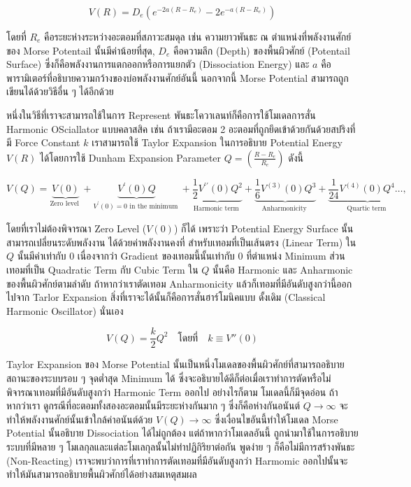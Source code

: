 \begin{equation}
  \label{eq:potential_bond_stretch}
  V(R) = D_{e} \left( e^{-2a(R-R_{e})} -2e^{-a(R-R_{e})} \right)
\end{equation}

\noindent โดยที่ $R_{e}$ คือระยะห่างระหว่างอะตอมที่สภาวะสมดุล เช่น ความยาวพันธะ ณ ตำแหน่งที่พลังงานศักย์ของ Morse Potentail
นั้นมีค่าน้อยที่สุด, $D_{e}$ คือความลึก (Depth) ของพื้นผิวศักย์ (Potentail Surface) ซึ่งก็คือพลังงานการแตกออกหรือการแยกตัว (Dissociation
Energy) และ $a$ คือพารามิเตอร์ที่อธิบายความกว้างของบ่อพลังงานศักย์อันนี้ นอกจากนี้ Morse Potential สามารถถูกเขียนได้ด้วยวิธีอื่น ๆ ได้อีกด้วย

หนึ่งในวิธีที่เราจะสามารถใช้ในการ Represent พันธะโควาเลนท์ก็คือการใช้โมเดลการสั่น Harmonic OSciallator แบบคลาสสิค
เช่น ถ้าเรามีอะตอม 2 อะตอมที่ถูกยึดเข้าด้วยกันด้วยสปริงที่มี Force Constant $k$ เราสามารถใช้ Taylor Expansion ในการอธิบาย Potential
Energy $V(R)$ ได้โดยการใช้ Dunham Expansion Parameter $Q = (\frac{R-R_{e}}{R_{e}})$ ดังนี้

\begin{equation}
  V(Q)
  =
  \underbrace{V(0)}_{\text {Zero level }}
  + \underbrace{V^{\prime}(0) Q}_{V^{\prime}(0)=0 \text { in the minimum }}
  + \underbrace{\frac{1}{2} V^{\prime \prime}(0) Q^2}_{\text {Harmonic term }}
  + \underbrace{\frac{1}{6} V^{(3)}(0) Q^3}_{\text {Anharmonicity }}
  + \underbrace{\frac{1}{24} V^{(4)}(0) Q^4 \ldots,}_{\text {Quartic term }}
\end{equation}

\noindent โดยที่เราไม่ต้องพิจารณา Zero Level ($V(0)$) ก็ได้ เพราะว่า Potential Energy Surface นั้นสามารถเปลี่ยนระดับพลังงาน%
ได้ด้วยค่าพลังงานคงที่ สำหรับเทอมที่เป็นเส้นตรง (Linear Term) ใน $Q$ นั้นมีค่าเท่ากับ 0 เนื่องจากว่า Gradient ของเทอมนี้นั้นเท่ากับ 0
ที่ตำแหน่ง Minimum ส่วนเทอมที่เป็น Quadratic Term กับ Cubic Term ใน $Q$ นั้นคือ Harmonic และ Anharmonic ของพื้นผิวศักย์ตามลำดับ
ถ้าหากว่าเราตัดเทอม Anharmonicity แล้วก็เทอมที่มีอันดับสูงกว่านี้ออกไปจาก Tarlor Expansion สิ่งที่เราจะได้นั้นก็คือการสั่นฮาร์โมนิคแบบ%
ดั้งเดิม (Classical Harmonic Oscillator) นั่นเอง

\begin{equation}
  V(Q)
  =
  \frac{k}{2} Q^{2} \quad \text{โดยที่} \quad k \equiv V''(0)
\end{equation}

Taylor Expansion ของ Morse Potential นั้นเป็นหนึ่งโมเดลของพื้นผิวศักย์ที่สามารถอธิบายสถานะของระบบรอบ ๆ จุดต่ำสุด Minimum ได้
ซึ่งจะอธิบายได้ดีก็ต่อเมื่อเราทำการตัดหรือไม่พิจารณาเทอมที่มีอันดับสูงกว่า Harmonic Term ออกไป อย่างไรก็ตาม โมเดลนี้ก็มีจุดอ่อน ถ้าหากว่าเรา%
ดูกรณีที่อะตอมทั้งสองอะตอมนั้นมีระยะห่างกันมาก ๆ ซึ่งก็คือห่างกันอนันต์ $Q \rightarrow \infty$ จะทำให้พลังงานศักย์นั้นเข้าใกล้ค่าอนันต์ด้วย
$V(Q) \rightarrow \infty$ ซึ่งเงื่อนไขอันนี้ทำให้โมเดล Morse Potential นั้นอธิบาย Dissociation ได้ไม่ถูกต้อง แต่ถ้าหากว่าโมเดลอันนี้%
ถูกนำมาใช้ในการอธิบายระบบที่มีหลาย ๆ โมเลกุลและแต่ละโมเลกุลนั้นไม่ทำปฏิกิริยาต่อกัน พูดง่าย ๆ ก็คือไม่มีการสร้างพันธะ (Non-Reacting)
เราจะพบว่าการที่เราทำการตัดเทอมที่มีอันดับสูงกว่า Harmomic ออกไปนั้นจะทำให้มันสามารถอธิบายพื้นผิวศักย์ได้อย่างสมเหตุสมผล

